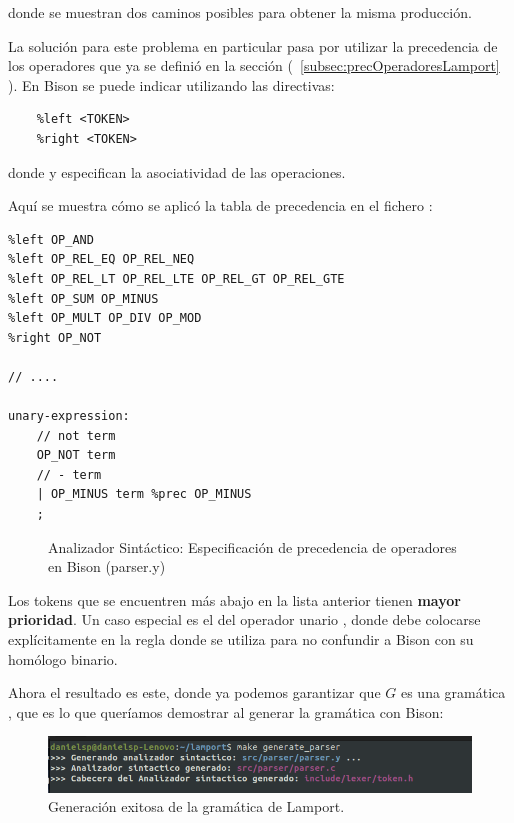 \noindent
donde se muestran dos caminos posibles para obtener la misma producción.



La solución para este problema en particular pasa por utilizar la precedencia de los operadores que ya se definió en la sección (~\ref{subsec:precOperadoresLamport} ). En Bison se puede indicar utilizando las directivas:

\begin{verbatim}
    %left <TOKEN>
    %right <TOKEN>
\end{verbatim}

\noindent
donde  y  especifican la asociatividad de las operaciones.



\noindent
Aquí se muestra cómo se aplicó la tabla de precedencia en el fichero :
\begin{lstlisting}[style=customflex]
%left OP_OR
%left OP_AND
%left OP_REL_EQ OP_REL_NEQ
%left OP_REL_LT OP_REL_LTE OP_REL_GT OP_REL_GTE
%left OP_SUM OP_MINUS
%left OP_MULT OP_DIV OP_MOD
%right OP_NOT

// ....

unary-expression:
    // not term
    OP_NOT term
    // - term
    | OP_MINUS term %prec OP_MINUS
    ;

\end{lstlisting}
\begin{figure}[h]
\caption{Analizador Sintáctico: Especificación de precedencia de operadores en Bison (parser.y)}
\label{fig:bisonPrecOperators}
\end{figure}

Los tokens que se encuentren más abajo en la lista anterior tienen \textbf{mayor prioridad}. Un caso especial es el del operador unario \code{-}, donde debe colocarse explícitamente en la regla donde se utiliza para no confundir a Bison con su homólogo binario.



Ahora el resultado es este, donde ya podemos garantizar que $G$ es una gramática , que es lo que queríamos demostrar al generar la gramática con Bison:
\begin{figure}[h]
    \includegraphics[width=\linewidth]{images/implementacion/parser/parser_success.png}
    \caption{Generación exitosa de la gramática de Lamport.}
    \label{fig:parser_success}
\end{figure}

